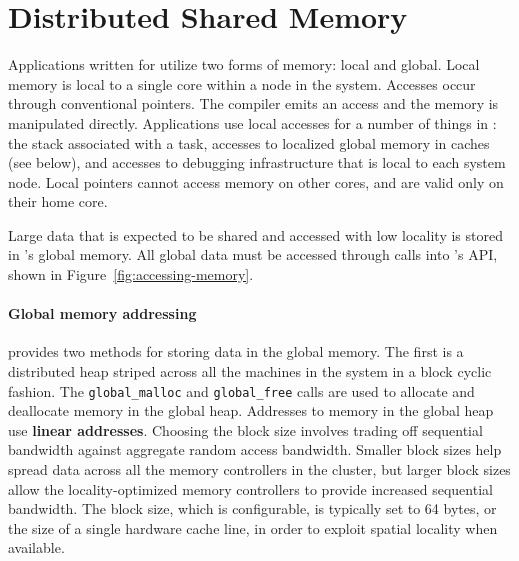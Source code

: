 \section{Distributed Shared Memory}

Applications written for \Grappa utilize two forms of memory: local and global.
Local memory is local to a single core within a node in the system. Accesses
occur through conventional pointers. The compiler emits an access and the
memory is manipulated directly. Applications use local accesses for a number
of things in \Grappa: the stack associated with a task, accesses to localized
global memory in caches (see below), and accesses to debugging infrastructure
that is local to each system node. Local pointers cannot access memory on
other cores, and are valid only on their home core.

Large data that is expected to be shared and accessed with low locality is
stored in \Grappa's global memory. All global data must be accessed through
calls into \Grappa's API, shown in Figure~\ref{fig:accessing-memory}.

\paragraph{Global memory addressing} \Grappa provides two methods for storing
data in the global memory. The first is a distributed heap striped across all
the machines in the system in a block cyclic fashion. The
\texttt{global\_malloc} and \texttt{global\_free} calls are used to allocate
and deallocate memory in the global heap. Addresses to memory in the global
heap use \textbf{linear addresses}. Choosing the block size involves trading
off sequential bandwidth against aggregate random access bandwidth. Smaller
block sizes help spread data across all the memory controllers in the cluster,
but larger block sizes allow the locality-optimized memory controllers to
provide increased sequential bandwidth. The block size, which is configurable,
is typically set to 64 bytes, or the size of a single hardware cache line, in
order to exploit spatial locality when available. 


